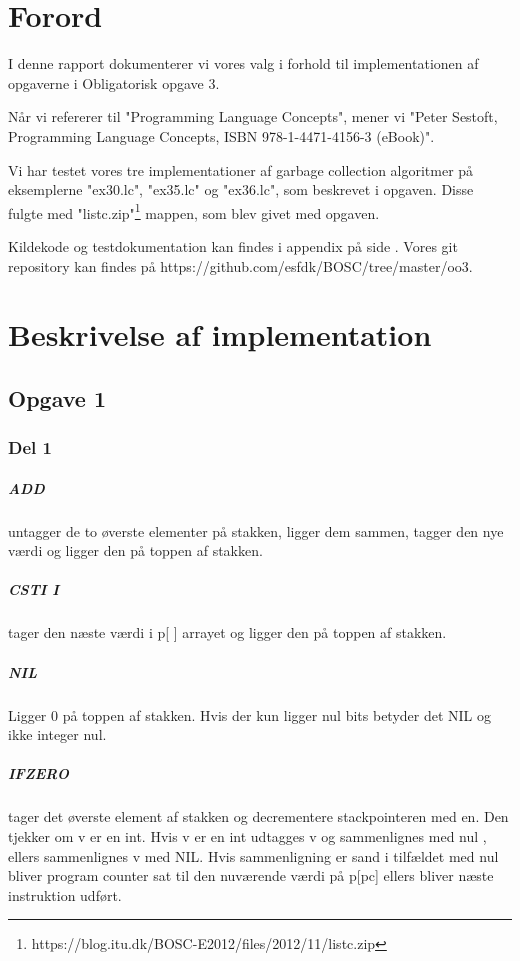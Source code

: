 \chapter{Forord}
I denne rapport dokumenterer vi vores valg i forhold til implementationen af opgaverne i Obligatorisk opgave 3.

Når vi refererer til "Programming Language Concepts", mener vi "Peter Sestoft, Programming Language Concepts, ISBN 978-1-4471-4156-3 (eBook)".

Vi har testet vores tre implementationer af garbage collection algoritmer på eksemplerne "ex30.lc", "ex35.lc" og "ex36.lc", som beskrevet i opgaven. Disse fulgte med "listc.zip"\footnote{https://blog.itu.dk/BOSC-E2012/files/2012/11/listc.zip} mappen, som blev givet med opgaven. 

Kildekode og testdokumentation kan findes i appendix på side \pageref{Appendix}. Vores git repository kan findes på https://github.com/esfdk/BOSC/tree/master/oo3.

\chapter{Beskrivelse af implementation}
\section{Opgave 1}
\label{O1}
\subsection{Del 1}
\label{O1_1}
	\paragraph{ADD} untagger de to øverste elementer på stakken, ligger dem sammen, tagger den nye værdi og ligger den på toppen af stakken.
	\paragraph{CSTI I} tager den næste værdi i p[ ] arrayet og ligger den på toppen af stakken.
	\paragraph{NIL} Ligger 0 på toppen af stakken. Hvis der kun ligger nul bits betyder det NIL og ikke integer nul.
	\paragraph{IFZERO} tager det øverste element af stakken og decrementere stackpointeren med en. Den tjekker om v er en int. Hvis v er en int udtagges v og sammenlignes med nul , ellers sammenlignes v med NIL. Hvis sammenligning er sand i tilfældet med nul bliver program counter sat til den nuværende værdi på p[pc] ellers bliver næste instruktion udført.
